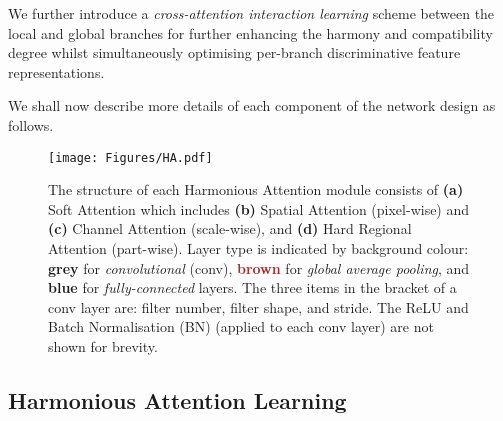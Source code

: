 \documentclass[10pt,twocolumn,letterpaper]{article}
\begin{document}
We further introduce a {\em cross-attention interaction learning} scheme 
between the local and global branches
for further enhancing the harmony and compatibility degree
whilst
simultaneously optimising per-branch discriminative feature representations.

We shall now describe more details of each component of the network
design as follows.

\begin{figure} [!ht]
	\centering
	\texttt{[image: Figures/HA.pdf]}
	\vskip -0.3cm
	\caption{ The structure of each Harmonious Attention module consists of
		{\bf (a)} Soft Attention which includes 
		{\bf (b)} Spatial Attention (pixel-wise)
		and 
		{\bf (c)} Channel Attention (scale-wise),
		and 
		{\bf (d)} Hard Regional Attention (part-wise).
		Layer type is indicated by background colour:
		\textcolor{battleshipgrey}{\bf grey} for \textit{convolutional} (conv),  
		\textcolor{brown}{\bf brown} for \textit{global average pooling}, 
		and 
		\textcolor{capri}{\bf blue} for \textit{fully-connected} layers.
		The three items in the bracket of a conv layer are:  
		filter number, filter shape, and stride.
The ReLU \cite{krizhevsky2012imagenet} and Batch Normalisation (BN) \cite{ioffe2015batch} (applied to each conv layer) are not shown for brevity. 
	}
	\label{fig:attentions}
	\vspace{-0.5cm}
\end{figure}

\subsection{Harmonious Attention Learning}
\label{sec:method_attention}
\end{document}
